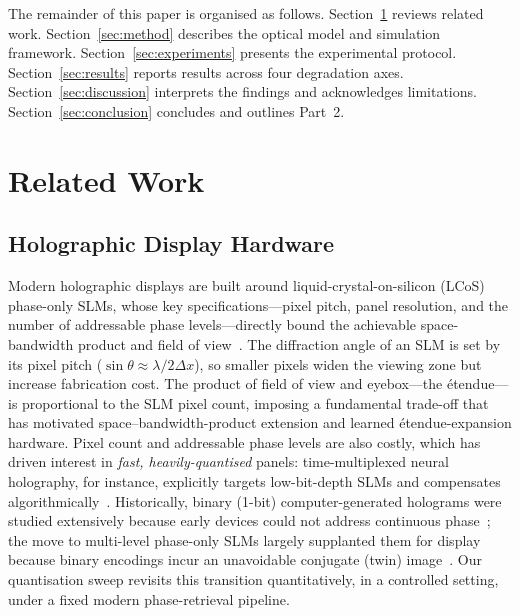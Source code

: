 \documentclass[conference]{IEEEtran}
\begin{document}
The remainder of this paper is organised as follows. Section~\ref{sec:related}
reviews related work. Section~\ref{sec:method} describes the optical model and
simulation framework. Section~\ref{sec:experiments} presents the experimental
protocol. Section~\ref{sec:results} reports results across four degradation axes.
Section~\ref{sec:discussion} interprets the findings and acknowledges
limitations. Section~\ref{sec:conclusion} concludes and outlines Part~2.

\section{Related Work}
\label{sec:related}

\subsection{Holographic Display Hardware}
Modern holographic displays are built around liquid-crystal-on-silicon (LCoS)
phase-only SLMs, whose key specifications---pixel pitch, panel resolution, and
the number of addressable phase levels---directly bound the achievable space-
bandwidth product and field of view~\cite{holoeye2023slm}. The diffraction
angle of an SLM is set by its pixel pitch ($\sin\theta \approx
\lambda/2\Delta x$), so smaller pixels widen the viewing zone but increase
fabrication cost. The product of field of view and eyebox---the {\'e}tendue---is proportional to
the SLM pixel count, imposing a fundamental trade-off that has motivated
space--bandwidth-product extension and learned {\'e}tendue-expansion hardware.
Pixel count and addressable phase levels are also costly, which has driven
interest in \emph{fast, heavily-quantised} panels: time-multiplexed neural
holography, for instance, explicitly targets low-bit-depth SLMs and compensates
algorithmically~\cite{choi2022time}. Historically, binary (1-bit)
computer-generated holograms were studied extensively because early devices could
not address continuous phase~\cite{brown1966complex,lee1978computer}; the move to
multi-level phase-only SLMs largely supplanted them for display because binary
encodings incur an unavoidable conjugate (twin) image~\cite{gabor1948new}. Our
quantisation sweep revisits this transition quantitatively, in a controlled
setting, under a fixed modern phase-retrieval pipeline.
\end{document}
